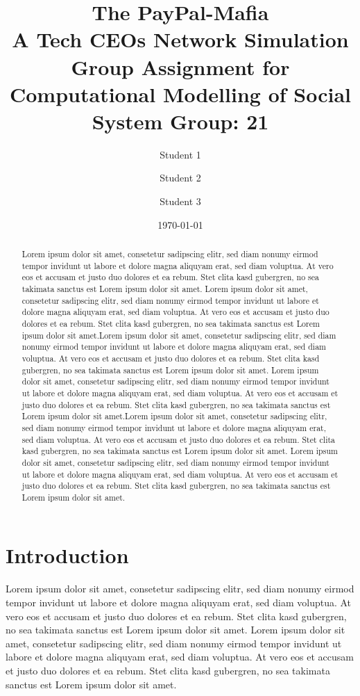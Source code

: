 \documentclass[12pt,a4paper,twocolumn]{article}
\title{The PayPal-Mafia \\ A Tech CEOs Network Simulation \\
\small Group Assignment for Computational Modelling of Social System Group: 21} %
\author[1]{Student 1} %
\author[2]{Student 2}
\author[3]{Student 3}
\affil[1]{Graz University of Technology, Graz, Austria}
\affil[2]{University of Graz, Graz, Austria}
\date{\today}
\begin{document}
\maketitle

\begin{abstract}
Lorem ipsum dolor sit amet, consetetur sadipscing elitr, sed diam nonumy eirmod tempor invidunt ut labore et dolore magna aliquyam erat, sed diam voluptua. At vero eos et accusam et justo duo dolores et ea rebum. Stet clita kasd gubergren, no sea takimata sanctus est Lorem ipsum dolor sit amet. Lorem ipsum dolor sit amet, consetetur sadipscing elitr, sed diam nonumy eirmod tempor invidunt ut labore et dolore magna aliquyam erat, sed diam voluptua. At vero eos et accusam et justo duo dolores et ea rebum. Stet clita kasd gubergren, no sea takimata sanctus est Lorem ipsum dolor sit amet.Lorem ipsum dolor sit amet, consetetur sadipscing elitr, sed diam nonumy eirmod tempor invidunt ut labore et dolore magna aliquyam erat, sed diam voluptua. At vero eos et accusam et justo duo dolores et ea rebum. Stet clita kasd gubergren, no sea takimata sanctus est Lorem ipsum dolor sit amet. Lorem ipsum dolor sit amet, consetetur sadipscing elitr, sed diam nonumy eirmod tempor invidunt ut labore et dolore magna aliquyam erat, sed diam voluptua. At vero eos et accusam et justo duo dolores et ea rebum. Stet clita kasd gubergren, no sea takimata sanctus est Lorem ipsum dolor sit amet.Lorem ipsum dolor sit amet, consetetur sadipscing elitr, sed diam nonumy eirmod tempor invidunt ut labore et dolore magna aliquyam erat, sed diam voluptua. At vero eos et accusam et justo duo dolores et ea rebum. Stet clita kasd gubergren, no sea takimata sanctus est Lorem ipsum dolor sit amet. Lorem ipsum dolor sit amet, consetetur sadipscing elitr, sed diam nonumy eirmod tempor invidunt ut labore et dolore magna aliquyam erat, sed diam voluptua. At vero eos et accusam et justo duo dolores et ea rebum. Stet clita kasd gubergren, no sea takimata sanctus est Lorem ipsum dolor sit amet.
\end{abstract}

\section{Introduction}
\label{sec:intro}
Lorem ipsum dolor sit amet, consetetur sadipscing elitr, sed diam nonumy eirmod tempor invidunt ut labore et dolore magna aliquyam erat, sed diam voluptua. At vero eos et accusam et justo duo dolores et ea rebum. Stet clita kasd gubergren, no sea takimata sanctus est Lorem ipsum dolor sit amet. Lorem ipsum dolor sit amet, consetetur sadipscing elitr, sed diam nonumy eirmod tempor invidunt ut labore et dolore magna aliquyam erat, sed diam voluptua. At vero eos et accusam et justo duo dolores et ea rebum. Stet clita kasd gubergren, no sea takimata sanctus est Lorem ipsum dolor sit amet.
\end{document}
